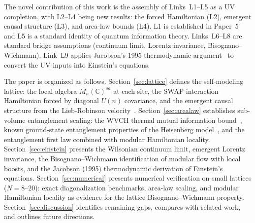 The novel contribution of this work is the assembly of Links~L1--L5 as
a UV completion, with L2--L4 being new results: the forced Hamiltonian
(L2), emergent causal structure (L3), and area-law bounds (L4).  L1 is
established in Paper~5~\cite{Paper5} and L5 is a standard identity of
quantum information theory.  Links~L6--L8 are standard bridge
assumptions (continuum limit, Lorentz invariance,
Bisognano--Wichmann).  Link~L9 applies Jacobson's 1995 thermodynamic
argument~\cite{Jacobson1995} to convert the UV inputs into Einstein's
equations.

The paper is organized as follows. Section~\ref{sec:lattice} defines the
self-modeling lattice: the local algebra $M_n(\mathbb{C})^{sa}$ at each
site, the SWAP interaction Hamiltonian forced by diagonal $U(n)$
covariance, and the emergent causal structure from the Lieb-Robinson
velocity~\cite{LiebRobinson1972, NachtergaeleSims2006}.
Section~\ref{sec:arealaw} establishes sub-volume entanglement scaling:
the WVCH thermal mutual information bound~\cite{WVCH2008}, known
ground-state entanglement properties of the Heisenberg
model~\cite{CalabreseCardy2004, Hastings2007}, and the entanglement
first law combined with modular Hamiltonian locality.
Section~\ref{sec:einstein} presents the Wilsonian continuum limit,
emergent Lorentz invariance, the Bisognano--Wichmann identification
of modular flow with local boosts, and the Jacobson (1995) thermodynamic
derivation of Einstein's equations.
Section~\ref{sec:numerical} presents numerical verification on small
lattices ($N = 8$--$20$): exact diagonalization benchmarks, area-law
scaling, and modular Hamiltonian locality as evidence for the lattice
Bisognano--Wichmann property.
Section~\ref{sec:discussion} identifies remaining gaps, compares with
related work, and outlines future directions.
